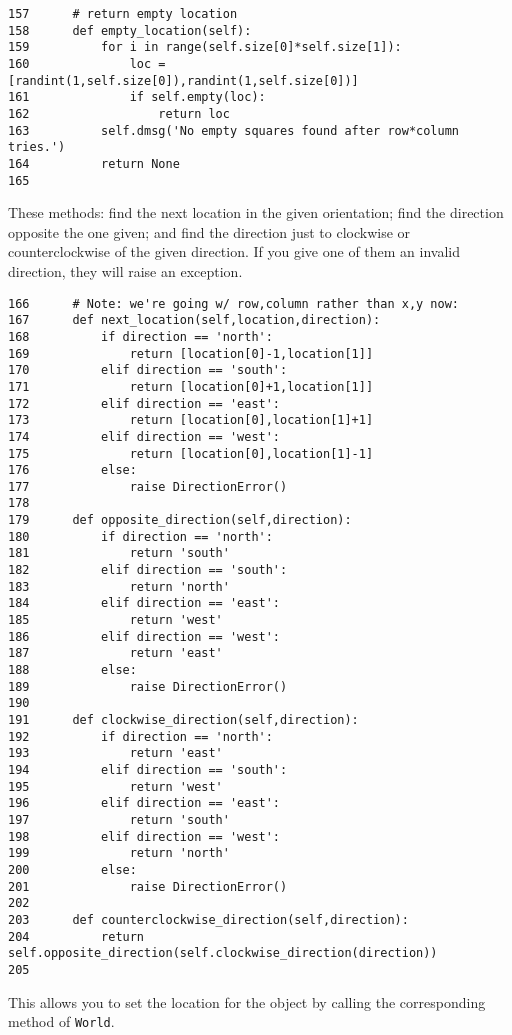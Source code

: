 \documentclass[11pt]{tufte-handout}
\begin{document}
\begin{verbatim}
157      # return empty location
158      def empty_location(self):
159          for i in range(self.size[0]*self.size[1]):
160              loc = [randint(1,self.size[0]),randint(1,self.size[0])]
161              if self.empty(loc):
162                  return loc
163          self.dmsg('No empty squares found after row*column tries.')
164          return None
165  
\end{verbatim}

These methods: find the next location in the given orientation; find the direction opposite the one given; and find the direction just to clockwise or counterclockwise of the given direction.  If you give one of them an invalid direction, they will raise an exception.

\begin{verbatim}
166      # Note: we're going w/ row,column rather than x,y now:
167      def next_location(self,location,direction):
168          if direction == 'north':
169              return [location[0]-1,location[1]]
170          elif direction == 'south':
171              return [location[0]+1,location[1]]
172          elif direction == 'east':
173              return [location[0],location[1]+1]            
174          elif direction == 'west':
175              return [location[0],location[1]-1]
176          else:
177              raise DirectionError()
178  
179      def opposite_direction(self,direction):
180          if direction == 'north':
181              return 'south'
182          elif direction == 'south':
183              return 'north'
184          elif direction == 'east':
185              return 'west'
186          elif direction == 'west':
187              return 'east'
188          else:
189              raise DirectionError()
190  
191      def clockwise_direction(self,direction):
192          if direction == 'north':
193              return 'east'
194          elif direction == 'south':
195              return 'west'
196          elif direction == 'east':
197              return 'south'
198          elif direction == 'west':
199              return 'north'
200          else:
201              raise DirectionError()
202  
203      def counterclockwise_direction(self,direction):
204          return self.opposite_direction(self.clockwise_direction(direction))
205  
\end{verbatim}

This allows you to set the location for the object by calling the corresponding method of \texttt{World}.
\end{document}
